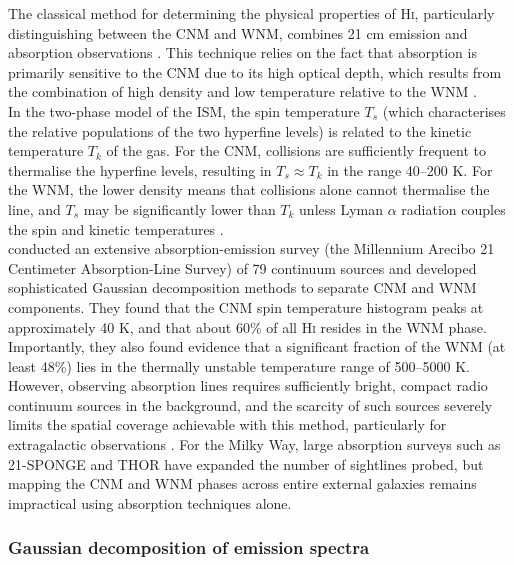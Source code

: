 The classical method for determining the physical properties of \textrm{H\textsc{i}}, particularly distinguishing between the CNM and WNM, combines 21 cm emission and absorption observations \citep{Kulkarni1988, Dickey1990, Heiles2003a}. This technique relies on the fact that absorption is primarily sensitive to the CNM due to its high optical depth, which results from the combination of high density and low temperature relative to the WNM \citep{kanekar2003, Roy2013}.\\\indent 
In the two-phase model of the ISM, the spin temperature $T_s$ (which characterises the relative populations of the two hyperfine levels) is related to the kinetic temperature $T_k$ of the gas. For the CNM, collisions are sufficiently frequent to thermalise the hyperfine levels, resulting in $T_s \approx T_k$ in the range 40--200 K. For the WNM, the lower density means that collisions alone cannot thermalise the line, and $T_s$ may be significantly lower than $T_k$ unless Lyman $\alpha$ radiation couples the spin and kinetic temperatures \citep{Field1958, Liszt2001, Heiles2003b}.\\\indent
\citet{Heiles2003a, Heiles2003b} conducted an extensive absorption-emission survey (the Millennium Arecibo 21 Centimeter Absorption-Line Survey) of 79 continuum sources and developed sophisticated Gaussian decomposition methods to separate CNM and WNM components. They found that the CNM spin temperature histogram peaks at approximately 40 K, and that about 60\% of all \textrm{H\textsc{i}} resides in the WNM phase. Importantly, they also found evidence that a significant fraction of the WNM (at least 48\%) lies in the thermally unstable temperature range of 500--5000 K.\\\indent
However, observing absorption lines requires sufficiently bright, compact radio continuum sources in the background, and the scarcity of such sources severely limits the spatial coverage achievable with this method, particularly for extragalactic observations \citep{kanekar2003, Murray2018}. For the Milky Way, large absorption surveys such as 21-SPONGE \citep{Murray2018} and THOR \citep{Beuther2016} have expanded the number of sightlines probed, but mapping the CNM and WNM phases across entire external galaxies remains impractical using absorption techniques alone.

\subsubsection{Gaussian decomposition of emission spectra}
\label{subsubsec:gaussian_decomposition}


